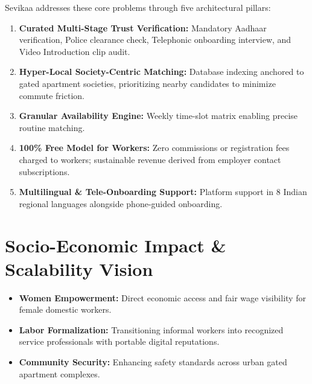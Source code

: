 \documentclass[11pt,a4paper]{article}
\begin{document}
Sevikaa addresses these core problems through five architectural pillars:
\begin{enumerate}
    \item \textbf{Curated Multi-Stage Trust Verification:} Mandatory Aadhaar verification, Police clearance check, Telephonic onboarding interview, and Video Introduction clip audit.
    \item \textbf{Hyper-Local Society-Centric Matching:} Database indexing anchored to gated apartment societies, prioritizing nearby candidates to minimize commute friction.
    \item \textbf{Granular Availability Engine:} Weekly time-slot matrix enabling precise routine matching.
    \item \textbf{100\% Free Model for Workers:} Zero commissions or registration fees charged to workers; sustainable revenue derived from employer contact subscriptions.
    \item \textbf{Multilingual \& Tele-Onboarding Support:} Platform support in 8 Indian regional languages alongside phone-guided onboarding.
\end{enumerate}

\section{Socio-Economic Impact \& Scalability Vision}
\begin{itemize}[noitemsep]
    \item \textbf{Women Empowerment:} Direct economic access and fair wage visibility for female domestic workers.
    \item \textbf{Labor Formalization:} Transitioning informal workers into recognized service professionals with portable digital reputations.
    \item \textbf{Community Security:} Enhancing safety standards across urban gated apartment complexes.
\end{itemize}
\end{document}

